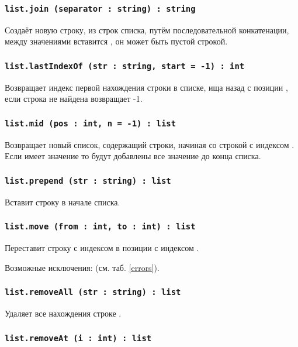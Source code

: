 \subsubsection{\lstinline|list.join (separator : string) : string|}

Создаёт новую строку, из строк списка, путём последовательной конкатенации, между значениями вставится , он может быть пустой строкой.

\subsubsection{\lstinline|list.lastIndexOf (str : string, start = -1) : int|}

Возвращает индекс первой нахождения строки  в списке, ища назад с позиции , если строка не найдена возвращает -1.

\subsubsection{\lstinline|list.mid (pos : int, n = -1) : list|}

Возвращает новый список, содержащий  строки, начиная со строкой с индексом . Если  имеет значение  то будут добавлены все значение до конца списка.

\subsubsection{\lstinline|list.prepend (str : string) : list|}

Вставит строку  в начале списка.

\subsubsection{\lstinline|list.move (from : int, to : int) : list|}

Переставит строку с индексом  в позиции с индексом .

Возможные исключения:  (см. таб. \ref{errors}).

\subsubsection{\lstinline|list.removeAll (str : string) : list|}

Удаляет все нахождения строке .

\subsubsection{\lstinline|list.removeAt (i : int) : list|}

